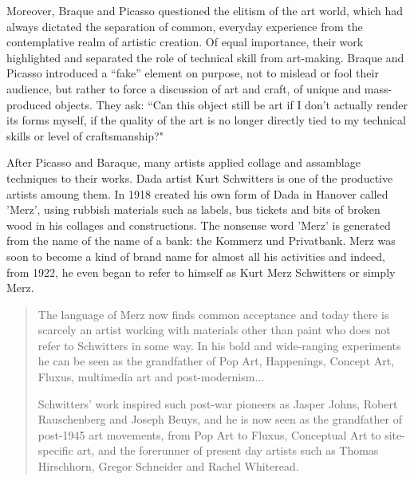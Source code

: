 


Moreover, Braque and Picasso questioned the elitism of the art world, which had always dictated the separation of common, everyday experience from the  contemplative realm of artistic creation. Of equal importance, their work highlighted and separated the role of technical skill from art-making. Braque and Picasso introduced a “fake” element on purpose, not to mislead or fool their audience, but rather to force a discussion of art and craft, of unique and mass-produced objects. They ask: “Can this object still be art if I don’t actually render its forms myself, if the quality of the art is no longer directly tied to my technical skills or level of craftsmanship?"

After Picasso and Baraque, many artists applied collage and assamblage techniques to their works. Dada artist Kurt Schwitters is one of the productive artists amoung them. In 1918 created his own form of Dada in Hanover called 'Merz', using rubbish materials such as labels, bus tickets and bits of broken wood in his collages and constructions. The nonsense word 'Merz' is generated from the name of the name of a bank: the Kommerz und Privatbank. Merz was soon to become a kind of brand name for almost all his activities and indeed, from 1922, he even began to refer to himself as Kurt Merz Schwitters or simply Merz.

\begin{quote}
The language of Merz now finds common acceptance and today there is scarcely an artist working with materials other than paint who does not refer to Schwitters in some way. In his bold and wide-ranging experiments he can be seen as the grandfather of Pop Art, Happenings, Concept Art, Fluxus, multimedia art and post-modernism...

Schwitters’ work inspired such post-war pioneers as Jasper Johns, Robert Rauschenberg and Joseph Beuys, and he is now seen as the grandfather of post-1945 art movements, from Pop Art to Fluxus, Conceptual Art to site-specific art, and the forerunner of present day artists such as Thomas Hirschhorn, Gregor Schneider and Rachel Whiteread. \citep{webster2011kurt}
\end{quote}

